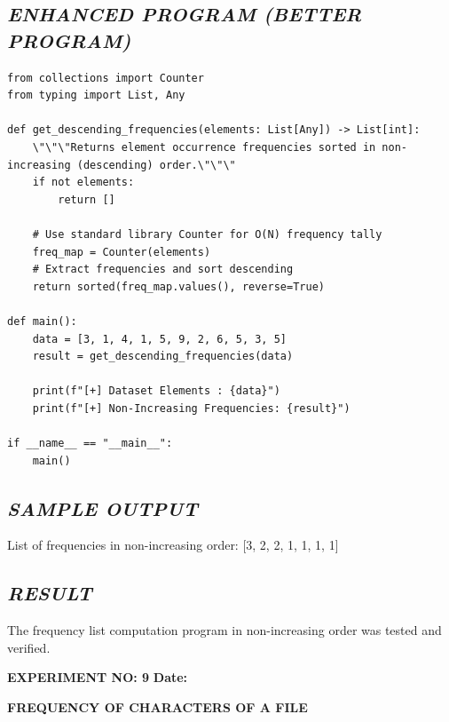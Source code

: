 \documentclass[11pt,a4paper]{article}
\begin{document}
\subsection*{\textit{ENHANCED PROGRAM (BETTER PROGRAM)}}
\begin{lstlisting}[style=pythonstyle]
from collections import Counter
from typing import List, Any

def get_descending_frequencies(elements: List[Any]) -> List[int]:
    \"\"\"Returns element occurrence frequencies sorted in non-increasing (descending) order.\"\"\"
    if not elements:
        return []
    
    # Use standard library Counter for O(N) frequency tally
    freq_map = Counter(elements)
    # Extract frequencies and sort descending
    return sorted(freq_map.values(), reverse=True)

def main():
    data = [3, 1, 4, 1, 5, 9, 2, 6, 5, 3, 5]
    result = get_descending_frequencies(data)
    
    print(f"[+] Dataset Elements : {data}")
    print(f"[+] Non-Increasing Frequencies: {result}")

if __name__ == "__main__":
    main()
\end{lstlisting}

\subsection*{\textit{SAMPLE OUTPUT}}
\begin{tcolorbox}[colback=black!85,colframe=navyblue,title=\textbf{Terminal Output},coltitle=white,fonttitle=\bfseries\small]
\small\ttfamily\color{green!30!white}
List of frequencies in non-increasing order: [3, 2, 2, 1, 1, 1, 1]
\end{tcolorbox}

\subsection*{\textit{RESULT}}
The frequency list computation program in non-increasing order was tested and verified.

\newpage

\noindent
\textbf{\large EXPERIMENT NO: 9} \hfill \textbf{\large Date: \underline{\hspace{3cm}}}

\vspace{0.2cm}
\begin{center}
{\Huge \textbf{\textcolor{navyblue}{FREQUENCY OF CHARACTERS OF A FILE}}}
\end{center}
\vspace{0.3cm}
\end{document}
